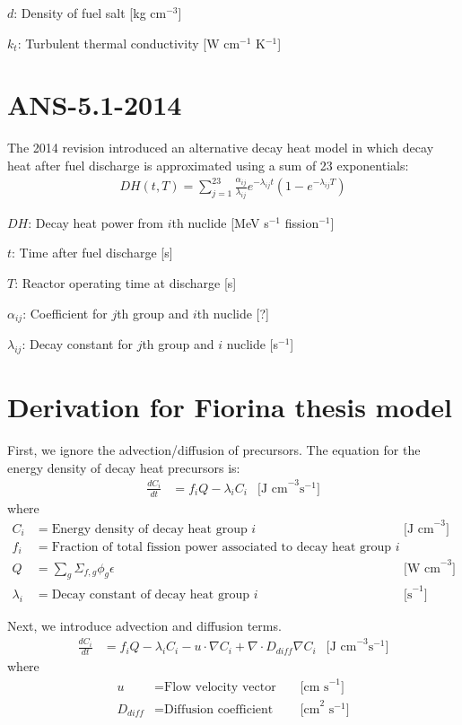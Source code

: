 \documentclass[letterpaper,11pt]{article}
\begin{document}
$d$: Density of fuel salt [kg cm$^{-3}$]

$k_t$: Turbulent thermal conductivity [W cm$^{-1}$ K$^{-1}$]

\section*{ANS-5.1-2014}

The 2014 revision introduced an alternative decay heat model in which decay
heat after fuel discharge is approximated using a sum of 23 exponentials:
%
\begin{align}
DH(t,T) = \sum^{23}_{j=1} \frac{\alpha_{ij}}{\lambda_{ij}} e^{-\lambda_{ij}
t} (1 - e^{-\lambda_{ij} T})
\end{align}

$DH$: Decay heat power from $i$th nuclide [MeV s$^{-1}$ fission$^{-1}$]

$t$: Time after fuel discharge [s]

$T$: Reactor operating time at discharge [s]

$\alpha_{ij}$: Coefficient for $j$th group and $i$th nuclide [?]

$\lambda_{ij}$: Decay constant for $j$th group and $i$ nuclide [s$^{-1}$]

\pagebreak

\section*{Derivation for Fiorina thesis model}

First, we ignore the advection/diffusion of precursors. The equation for the
energy density of decay heat precursors is:
%
\begin{align}
\frac{dC_i}{dt} &= f_i Q - \lambda_i C_i & \text{[J cm}^{-3} \text{s}^{-1} \text{]}
\end{align}
%
where
%
\begin{align*}
C_i &= \text{Energy density of decay heat group }i & &\text{ [J cm}^{-3}] \\
f_i &= \text{Fraction of total fission power associated to decay heat group }i & &\\
Q &= \sum_g \Sigma_{f,g} \phi_g \epsilon & &\text{ [W cm}^{-3}\text{]}\\
\lambda_i &= \text{Decay constant of decay heat group }i & &\text{ [s}^{-1}\text{]}
\end{align*}

Next, we introduce advection and diffusion terms.
%
\begin{align}
\frac{dC_i}{dt} &= f_i Q - \lambda_i C_i - u \cdot\nabla C_i + \nabla \cdot D_{diff} \nabla C_i & \text{[J cm}^{-3} \text{s}^{-1} \text{]}
\end{align}
%
where
%
\begin{align*}
u &= \text{Flow velocity vector} & &\text{ [cm s}^{-1}\text{]} \\
D_{diff} &= \text{Diffusion coefficient} & &\text{ [cm}^2\text{ s}^{-1}\text{]}
\end{align*}
\end{document}
